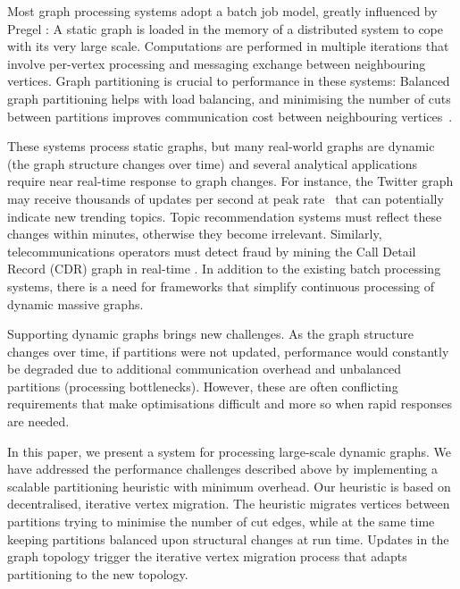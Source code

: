 \documentclass{sig-alternate-10pt}
\begin{document}
Most graph processing systems adopt a batch job model, greatly
influenced by  Pregel  \cite{Malewicz2009}: A static graph is loaded in the memory of a distributed system to cope with its very large scale. Computations are performed in multiple iterations that involve per-vertex processing and messaging exchange between neighbouring vertices. Graph partitioning is crucial to performance in these systems: Balanced graph partitioning helps with load balancing, and minimising the number of cuts between partitions improves communication cost between neighbouring vertices~\cite{Malewicz2009}. 

These systems process static graphs, but many real-world graphs are dynamic (the graph structure changes over time) and several 
analytical applications require near real-time response to graph changes. For instance, the Twitter graph may receive thousands of updates per second at
peak rate~\cite{twitterrate} that can potentially indicate new trending topics.
Topic recommendation systems must reflect these changes within minutes,
otherwise they become irrelevant.  Similarly, telecommunications operators must detect fraud by
mining the Call Detail Record (CDR) graph in real-time \cite{Weigert2011}. In addition to
the existing batch processing systems, there is a need for frameworks that simplify
continuous processing of dynamic massive graphs.

Supporting  dynamic graphs brings new challenges. As the graph structure changes over time, if partitions were not updated, performance would constantly be degraded due to additional communication overhead and unbalanced partitions (processing bottlenecks). However, these are often conflicting requirements that make optimisations difficult and more so when rapid responses are needed. 
 
In this paper, we present a system for processing large-scale dynamic graphs. We 
have addressed the performance challenges described above by implementing a
scalable partitioning heuristic with minimum overhead. Our heuristic is based on decentralised, iterative
vertex migration. The heuristic migrates vertices between partitions trying to minimise the number of cut
edges, while at the same time keeping partitions balanced upon structural changes at run time. Updates in the graph topology trigger the iterative vertex migration process that adapts partitioning to the new topology.
\end{document}
